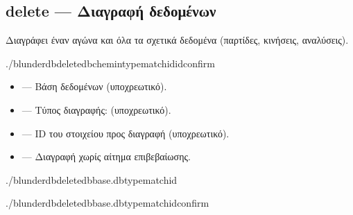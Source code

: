 \documentclass[letterpaper,10pt,greek]{sphinxmanual}
\begin{document}
\subsection{delete — Διαγραφή δεδομένων}
\label{\detokenize{cli:delete-supprimer-des-donnees}}
\sphinxAtStartPar
Διαγράφει έναν αγώνα και όλα τα σχετικά δεδομένα (παρτίδες, κινήσεις, αναλύσεις).

\begin{sphinxVerbatim}[commandchars=\\\{\}]
./blunderdbdelete\PYGZhy{}\PYGZhy{}db\PYGZlt{}chemin\PYGZgt{}\PYGZhy{}\PYGZhy{}typematch\PYGZhy{}\PYGZhy{}id\PYGZlt{}id\PYGZgt{}\PYG{o}{[}\PYGZhy{}\PYGZhy{}confirm\PYG{o}{]}
\end{sphinxVerbatim}

\sphinxAtStartPar
{}
\begin{itemize}
\item {} 
\sphinxAtStartPar
{} — Βάση δεδομένων (υποχρεωτικό).

\item {} 
\sphinxAtStartPar
{} — Τύπος διαγραφής:  (υποχρεωτικό).

\item {} 
\sphinxAtStartPar
{} — ID του στοιχείου προς διαγραφή (υποχρεωτικό).

\item {} 
\sphinxAtStartPar
{} — Διαγραφή χωρίς αίτημα επιβεβαίωσης.

\end{itemize}

\sphinxAtStartPar
{}

\begin{sphinxVerbatim}[commandchars=\\\{\}]
./blunderdbdelete\PYGZhy{}\PYGZhy{}dbbase.db\PYGZhy{}\PYGZhy{}typematch\PYGZhy{}\PYGZhy{}id

./blunderdbdelete\PYGZhy{}\PYGZhy{}dbbase.db\PYGZhy{}\PYGZhy{}typematch\PYGZhy{}\PYGZhy{}id\PYGZhy{}\PYGZhy{}confirm
\end{sphinxVerbatim}
\end{document}
